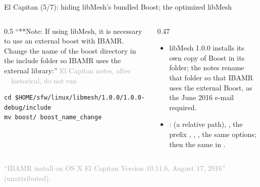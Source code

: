 \documentclass[aspectratio=169,11pt]{beamer}
\newcommand{\sourcecredit}[1]{\vfill\begin{flushright}\tiny\textcolor{DarkGray}{#1}\end{flushright}}
\newcommand{\hist}[1]{{\tiny\sffamily\textcolor{DarkGray}{#1\ \textbullet\ historical, do not run}}\par\nointerlineskip\vspace{0.3mm}}
\begin{document}
\begin{frame}[fragile]{El Capitan (5/7): hiding libMesh's bundled Boost; the optimized libMesh}
\label{fr:ec4b}
\begin{columns}[T,onlytextwidth]
\begin{column}{0.5\textwidth}
\small ``**Note: If using libMesh, it is necessary to use an external boost with IBAMR. Change the name of the boost directory in the include folder so IBAMR uses the external library:''
\hist{El Capitan notes, after }
\begin{lstlisting}[style=hist]
cd $HOME/sfw/linux/libmesh/1.0.0/1.0.0-debug/include
mv boost/ boost_name_change
\end{lstlisting}
\end{column}
\begin{column}{0.47\textwidth}
\footnotesize
\begin{itemize}\setlength{\itemsep}{3pt}
  \item libMesh 1.0.0 installs its own copy of Boost in its  folder; the notes rename that folder so that IBAMR uses the external Boost, as the June 2016 e-mail required.
  \item {}:  (a relative path), , the prefix , , , the same options; then the same  in .
\end{itemize}
\end{column}
\end{columns}
\sourcecredit{``IBAMR install on OS X El Capitan Version 10.11.6, August 17, 2016'' (unattributed).}
\end{frame}
\end{document}
